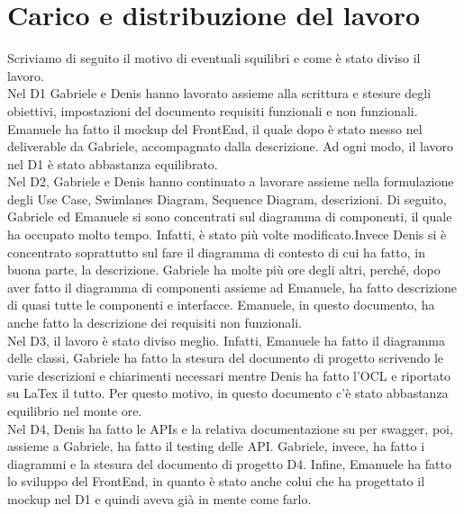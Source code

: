 \documentclass{article}
\begin{document}
\section{Carico e distribuzione del lavoro}

Scriviamo di seguito il motivo di eventuali squilibri e come è stato diviso il lavoro.\\







Nel D1 Gabriele e Denis hanno lavorato assieme alla scrittura e stesure degli obiettivi, impostazioni del documento requisiti funzionali e non funzionali. Emanuele ha fatto il mockup del FrontEnd, il quale dopo è stato messo nel deliverable da Gabriele, accompagnato dalla descrizione. Ad ogni modo, il lavoro nel D1 è stato abbastanza equilibrato. \\







Nel D2, Gabriele e Denis hanno continuato a lavorare assieme nella formulazione degli Use Case, Swimlanes Diagram, Sequence Diagram, descrizioni.
Di seguito, Gabriele ed Emanuele si sono concentrati sul diagramma di componenti, il quale ha occupato molto tempo. Infatti, è stato più volte modificato.Invece Denis si è concentrato soprattutto sul fare il diagramma di contesto di cui ha fatto, in buona parte, la descrizione. Gabriele ha molte più ore degli altri, perché, dopo aver fatto il diagramma di componenti assieme ad Emanuele, ha fatto descrizione di quasi tutte le componenti e interfacce. Emanuele, in questo documento, ha anche fatto la descrizione dei requisiti non funzionali.\\







Nel D3, il lavoro è stato diviso meglio. Infatti, Emanuele ha fatto il diagramma delle classi, Gabriele ha fatto la stesura del documento di progetto scrivendo le varie descrizioni e chiarimenti necessari mentre Denis ha fatto l'OCL e riportato su LaTex il tutto. Per questo motivo, in questo documento c'è stato abbastanza equilibrio nel monte ore.\\







Nel D4, Denis ha fatto le APIs e la relativa documentazione su per swagger, poi, assieme a Gabriele, ha fatto il testing delle API. Gabriele, invece, ha fatto i diagrammi e la stesura del documento di progetto D4. Infine, Emanuele ha fatto lo sviluppo del FrontEnd, in quanto è stato anche colui che ha progettato il mockup nel D1 e quindi aveva già in mente come farlo.\\
\end{document}
